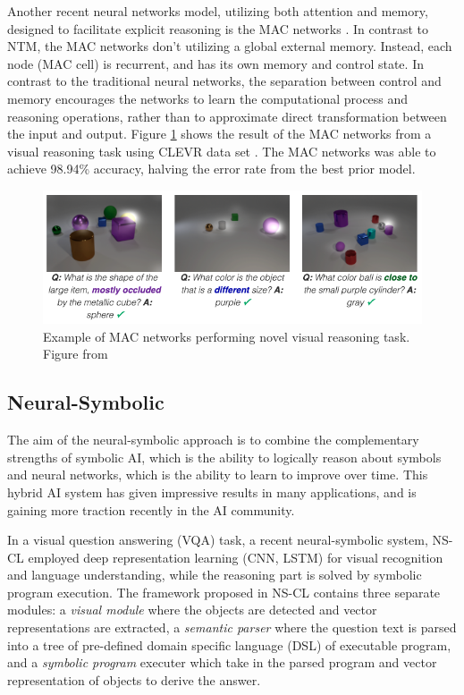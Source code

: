 \documentclass[journal]{IEEEtran}
\begin{document}
Another recent neural networks model, utilizing both attention and memory, designed to facilitate explicit reasoning is the MAC networks \cite{hudson2018compositional}.
In contrast to NTM, the MAC networks don't utilizing a global external memory. Instead, each node (MAC cell) is recurrent, and has its own memory and control state.
In contrast to the traditional neural networks, the separation between control and memory encourages the networks to 
learn the computational process and reasoning operations, rather than to approximate direct transformation between the input and output.
Figure \ref{mac-clevr} shows the result of the MAC networks from a visual reasoning task using CLEVR data set \cite{johnson2017clevr}. 
The MAC networks was able to achieve 98.94\% accuracy, halving the error rate from the best prior model.
\begin{figure}[htb]
  \includegraphics[width=\linewidth]{mac-clevr.png}
  \caption{Example of MAC networks performing novel visual reasoning task. Figure from \cite{hudson2018compositional}}
  \label{mac-clevr}
\end{figure}

\subsection{Neural-Symbolic}
The aim of the neural-symbolic approach is to combine the complementary strengths of symbolic AI, 
which is the ability to logically reason about symbols and neural networks, which is the ability to learn to improve over time.
This hybrid AI system has given impressive results in many applications, and is gaining more traction recently in the AI community.

In a visual question answering (VQA) task, a recent neural-symbolic system, NS-CL \cite{Mao2019NeuroSymbolic} employed deep representation learning (CNN, LSTM)
for visual recognition and language understanding, while the reasoning part is solved by symbolic program execution.
The framework proposed in NS-CL contains three separate modules: 
a \textit{visual module} where the objects are detected and vector representations are extracted, 
a \textit{semantic parser} where the question text is parsed into a tree of pre-defined domain specific language (DSL) of executable program,
and a \textit{symbolic program} executer which take in the parsed program and vector representation of objects to derive the answer. 
\end{document}

